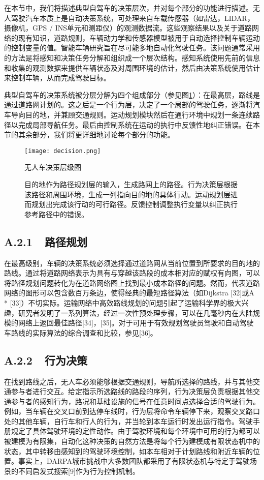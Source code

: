 在本节中，我们将描述典型自驾车的决策层次，并对每个部分的功能进行描述。无人驾驶汽车本质上是自动决策系统，可处理来自车载传感器（如雷达，LIDAR，摄像机，GPS / INS单元和测距仪）的观测数据流。这些观察结果以及关于道路网络的现有知识，道路规则，车辆动力学和传感器模型被用于自动选择控制车辆运动的控制变量的值。智能车辆研究旨在尽可能多地自动化驾驶任务。该问题通常采用的方法是将感知和决策任务分解和组织成一个层次结构。感知系统使用先前的信息和收集的观测数据来提供车辆状态及对周围环境的估计，然后由决策系统使用估计来控制车辆，从而完成驾驶目标。

典型自驾车的决策系统被分层分解为四个组成部分（参见图\ref{fig:decision}）：在最高层，路线是通过道路网计划的。这之后是一个行为层，决定了一个局部的驾驶任务，逐渐将汽车导向目的地，并兼顾交通规则。运动规划模块然后在通行环境中规划一条连续路径以完成局部导航任务。最后由控制系统在运动的执行中反馈性地纠正错误。在本节的其余部分，我们将更详细地讨论每个部分的功能。

\begin{figure}
\centering
\texttt{[image: decision.png]}
\captionsetup{margin=2cm}
\caption{无人车决策层级图}
\caption*{目的地作为路径规划层的输入，生成路网上的路径。行为决策层根据该路径和周围环境，生成一列指向目的地的具体行动。运动规划层进而规划出完成该行动的可行路径。反馈控制调整执行变量以纠正执行参考路径中的错误。}
\label{fig:decision}
\end{figure}

\subsection*{A.2.1\ \ 路径规划}
在最高级别，车辆的决策系统必须选择通过道路网从当前位置到所要求的目的地的路线。通过将道路网络表示为具有与穿越该路段的成本相对应的赋权有向图，可以将路径规划问题转化为在道路网络图上找到最小成本路径的问题。然而，代表道路网络的图形可以包含数百万条边，使得经典的最短路径算法（如Dijkstra [32]或A * [33]）不切实际。运输网络中高效路线规划的问题引起了运输科学界的极大兴趣，研究者发明了一系列算法，经过一次性预处理步骤，可以在几毫秒内在大陆规模的网络上返回最佳路径[34]，[35]。对于可用于有效规划驾驶员驾驶和自动驾驶车路线的实际算法的综合调查和比较，参见[36]。

\subsection*{A.2.2\ \ 行为决策}
在找到路线之后，无人车必须能够根据交通规则，导航所选择的路线，并与其他交通参与者进行交互。给定指示所选路线的路段的序列，行为决策层负责根据其他交通参与者的感知行为，路况和基础设施的信号在任意时间点选择合适的驾驶行为。例如，当车辆在交叉口前到达停车线时，行为层将命令车辆停下来，观察交叉路口处的其他车辆，自行车和行人的行为，并当轮到本车运行时发出运行指令。驾驶手册规定了具体驾驶环境的定性动作。由于驾驶环境和每个环境中可用的行为都可以被建模为有限集，自动化这种决策的自然方法是将每个行为建模成有限状态机中的状态，其中转移由感知到的驾驶环境控制，如本车相对于计划路线和附近车辆的位置。事实上，DARPA城市挑战中大多数团队都采用了有限状态机与特定于驾驶场景的不同启发式搜索[9]作为行为控制机制。

